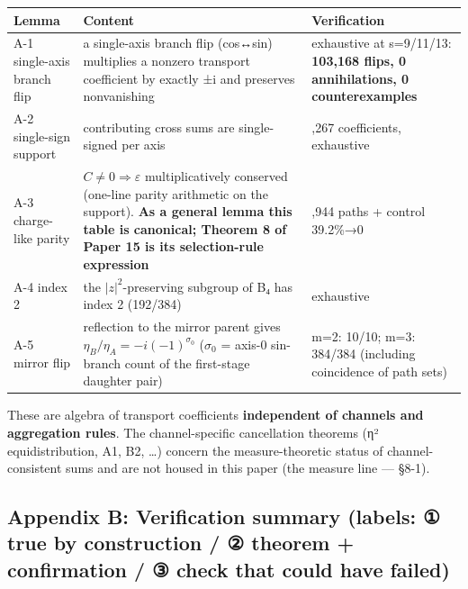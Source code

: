 \documentclass[
]{ltjsarticle}
\newcounter{none} %
\begin{document}
{\def\LTcaptype{none} %
\begin{longtable}[]{@{}
  >{\raggedright\arraybackslash}p{}
  >{\raggedright\arraybackslash}p{}
  >{\raggedright\arraybackslash}p{}@{}}
\toprule\noalign{}
\begin{minipage}[b]{\linewidth}\raggedright
Lemma
\end{minipage} & \begin{minipage}[b]{\linewidth}\raggedright
Content
\end{minipage} & \begin{minipage}[b]{\linewidth}\raggedright
Verification
\end{minipage} \\
\midrule\noalign{}
\endhead
\bottomrule\noalign{}
\endlastfoot
A-1 single-axis branch flip & a single-axis branch flip (cos↔sin)
multiplies a nonzero transport coefficient by exactly ±i and preserves
nonvanishing & exhaustive at s=9/11/13: \textbf{103,168 flips, 0
annihilations, 0 counterexamples} \\
A-2 single-sign support & contributing cross sums are single-signed per
axis & 55,267 coefficients, exhaustive \\
A-3 charge-like parity & \(C\neq0\Rightarrow\varepsilon\)
multiplicatively conserved (one-line parity arithmetic on the support).
\textbf{As a general lemma this table is canonical; Theorem 8 of Paper
15 is its selection-rule expression} & 118,944 paths + control
39.2\%→0 \\
A-4 index 2 & the \(|z|^2\)-preserving subgroup of B₄ has index 2
(192/384) & exhaustive \\
A-5 mirror flip & reflection to the mirror parent gives
\(\eta_B/\eta_A=-i(-1)^{\sigma_0}\) (\(\sigma_0\) = axis-0 sin-branch
count of the first-stage daughter pair) & m=2: 10/10; m=3: 384/384
(including coincidence of path sets) \\
\end{longtable}
}

These are algebra of transport coefficients \textbf{independent of
channels and aggregation rules}. The channel-specific cancellation
theorems (η² equidistribution, A1, B2, \ldots) concern the
measure-theoretic status of channel-consistent sums and are not housed
in this paper (the measure line --- §8-1).

\subsection{Appendix B: Verification summary (labels: ① true by
construction / ② theorem + confirmation / ③ check that could have
failed)}\label{appendix-b-verification-summary-labels-ux2460-true-by-construction-ux2461-theorem-confirmation-ux2462-check-that-could-have-failed}
\end{document}
